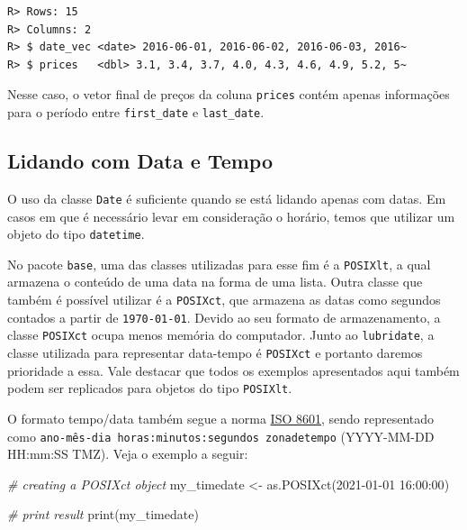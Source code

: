 \documentclass[
  11pt,
]{book}
\newenvironment{Shaded}{\begin{snugshade}}{\end{snugshade}}
\newcommand{\CommentTok}[1]{\textcolor[rgb]{0.37,0.37,0.37}{\textit{#1}}}
\newcommand{\FunctionTok}[1]{\textcolor[rgb]{0,0,0}{#1}}
\newcommand{\NormalTok}[1]{#1}
\newcommand{\OtherTok}[1]{\textcolor[rgb]{0.37,0.37,0.37}{#1}}
\newcommand{\StringTok}[1]{\textcolor[rgb]{0.5,0.5,0.5}{#1}}
\begin{document}
\begin{verbatim}
R> Rows: 15
R> Columns: 2
R> $ date_vec <date> 2016-06-01, 2016-06-02, 2016-06-03, 2016~
R> $ prices   <dbl> 3.1, 3.4, 3.7, 4.0, 4.3, 4.6, 4.9, 5.2, 5~
\end{verbatim}

Nesse caso, o vetor final de preços da coluna \texttt{prices} contém apenas informações para o período entre \texttt{first\_date} e \texttt{last\_date}.

\hypertarget{lidando-com-data-e-tempo}{%
\subsection{Lidando com Data e Tempo}\label{lidando-com-data-e-tempo}}

O uso da classe \texttt{Date} é suficiente quando se está lidando apenas com datas. Em casos em que é necessário levar em consideração o horário, temos que utilizar um objeto do tipo \texttt{datetime}.

No pacote \texttt{base}, uma das classes utilizadas para esse fim é a \texttt{POSIXlt}, a qual armazena o conteúdo de uma data na forma de uma lista. Outra classe que também é possível utilizar é a \texttt{POSIXct}, que armazena as datas como segundos contados a partir de \texttt{1970-01-01}. Devido ao seu formato de armazenamento, a classe \texttt{POSIXct} ocupa menos memória do computador. Junto ao \texttt{lubridate}, a classe utilizada para representar data-tempo é \texttt{POSIXct} e portanto daremos prioridade a essa. Vale destacar que todos os exemplos apresentados aqui também podem ser replicados para objetos do tipo \texttt{POSIXlt}.

O formato tempo/data também segue a norma \href{https://www.iso.org/iso-8601-date-and-time-format.html}{ISO 8601}, sendo representado como \texttt{ano-mês-dia\ horas:minutos:segundos\ zonadetempo} (YYYY-MM-DD HH:mm:SS TMZ). Veja o exemplo a seguir:

\begin{Shaded}
\begin{Highlighting}[]
\CommentTok{\# creating a POSIXct object}
\NormalTok{my\_timedate }\OtherTok{\textless{}{-}} \FunctionTok{as.POSIXct}\NormalTok{(}\StringTok{\textquotesingle{}2021{-}01{-}01 16:00:00\textquotesingle{}}\NormalTok{)}

\CommentTok{\# print result}
\FunctionTok{print}\NormalTok{(my\_timedate)}
\end{Highlighting}
\end{Shaded}
\end{document}
